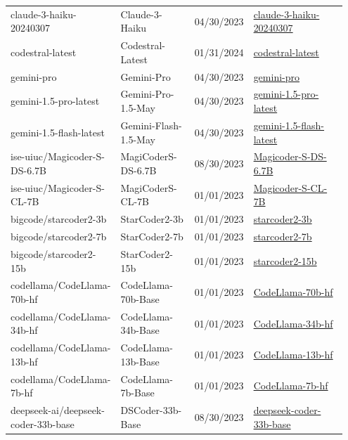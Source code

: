 \begin{longtable}{|p{0.3\linewidth}|p{0.22\linewidth}|p{0.15\linewidth}|p{0.28\linewidth}|}
claude-3-haiku-20240307 & Claude-3-Haiku & 04/30/2023 & \href{https://www.anthropic.com/claude}{claude-3-haiku-20240307} \\ 
codestral-latest & Codestral-Latest & 01/31/2024 & \href{https://mistral.ai/news/codestral/}{codestral-latest} \\ 
gemini-pro & Gemini-Pro & 04/30/2023 & \href{https://blog.google/technology/ai/gemini-api-developers-cloud}{gemini-pro} \\ 
gemini-1.5-pro-latest & Gemini-Pro-1.5-May & 04/30/2023 & \href{https://blog.google/technology/ai/gemini-api-developers-cloud}{gemini-1.5-pro-latest} \\ 
gemini-1.5-flash-latest & Gemini-Flash-1.5-May & 04/30/2023 & \href{https://blog.google/technology/ai/gemini-api-developers-cloud}{gemini-1.5-flash-latest} \\ 
ise-uiuc/Magicoder-S-DS-6.7B & MagiCoderS-DS-6.7B & 08/30/2023 & \href{https://huggingface.co/ise-uiuc/Magicoder-S-DS-6.7B}{Magicoder-S-DS-6.7B} \\ 
ise-uiuc/Magicoder-S-CL-7B & MagiCoderS-CL-7B & 01/01/2023 & \href{https://huggingface.co/ise-uiuc/Magicoder-S-CL-7B}{Magicoder-S-CL-7B} \\ 
bigcode/starcoder2-3b & StarCoder2-3b & 01/01/2023 & \href{https://huggingface.co/bigcode/starcoder2-3b}{starcoder2-3b} \\ 
bigcode/starcoder2-7b & StarCoder2-7b & 01/01/2023 & \href{https://huggingface.co/bigcode/starcoder2-7b}{starcoder2-7b} \\ 
bigcode/starcoder2-15b & StarCoder2-15b & 01/01/2023 & \href{https://huggingface.co/bigcode/starcoder2-15b}{starcoder2-15b} \\ 
codellama/CodeLlama-70b-hf & CodeLlama-70b-Base & 01/01/2023 & \href{https://huggingface.co/codellama/CodeLlama-70b-hf}{CodeLlama-70b-hf} \\ 
codellama/CodeLlama-34b-hf & CodeLlama-34b-Base & 01/01/2023 & \href{https://huggingface.co/codellama/CodeLlama-34b-hf}{CodeLlama-34b-hf} \\ 
codellama/CodeLlama-13b-hf & CodeLlama-13b-Base & 01/01/2023 & \href{https://huggingface.co/codellama/CodeLlama-13b-hf}{CodeLlama-13b-hf} \\ 
codellama/CodeLlama-7b-hf & CodeLlama-7b-Base & 01/01/2023 & \href{https://huggingface.co/codellama/CodeLlama-7b-hf}{CodeLlama-7b-hf} \\ 
deepseek-ai/deepseek-coder-33b-base & DSCoder-33b-Base & 08/30/2023 & \href{https://huggingface.co/deepseek-ai/deepseek-coder-33b-base}{deepseek-coder-33b-base} \\ 

\end{longtable}
